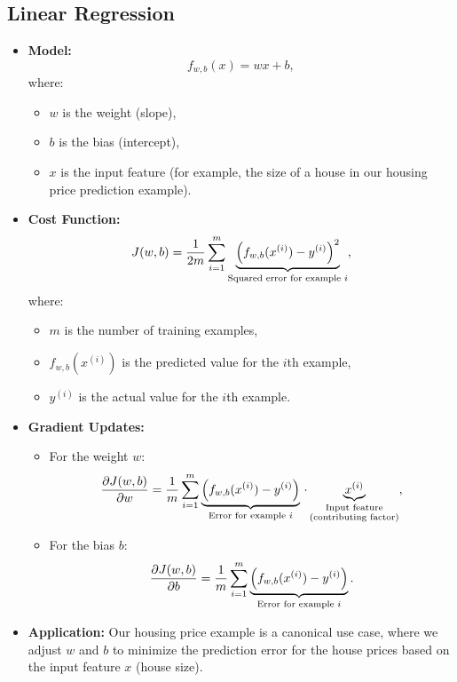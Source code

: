 \documentclass{article}
\begin{document}
\subsection{Linear Regression}
\begin{itemize}
    \item \textbf{Model:} 
    \[
    f_{w,b}(x) = wx + b,
    \]
    where:
    \begin{itemize}[label=\(\bullet\)]
        \item \(w\) is the weight (slope),
        \item \(b\) is the bias (intercept),
        \item \(x\) is the input feature (for example, the size of a house in our housing price prediction example).
    \end{itemize}

    \item \textbf{Cost Function:}
    \[
    J(w,b)=\frac{1}{2m}\sum_{i=1}^{m}\underbrace{\Bigl(f_{w,b}(x^{(i)})-y^{(i)}\Bigr)^2}_{\text{Squared error for example }i},
    \]
    where:
    \begin{itemize}[label=\(\bullet\)]
        \item \(m\) is the number of training examples,
        \item \(f_{w,b}(x^{(i)})\) is the predicted value for the \(i\)th example,
        \item \(y^{(i)}\) is the actual value for the \(i\)th example.
    \end{itemize}

    \item \textbf{Gradient Updates:}
    \begin{itemize}[leftmargin=*, label=\(\bullet\)]
        \item For the weight \(w\):
        \[
        \frac{\partial J(w,b)}{\partial w}=\frac{1}{m}\sum_{i=1}^{m} \underbrace{\Bigl(f_{w,b}(x^{(i)})-y^{(i)}\Bigr)}_{\text{Error for example }i} \, \cdot \underbrace{x^{(i)}}_{\substack{\text{Input feature} \\ \text{(contributing factor)}}},
        \]
        \item For the bias \(b\):
        \[
        \frac{\partial J(w,b)}{\partial b}=\frac{1}{m}\sum_{i=1}^{m} \underbrace{\Bigl(f_{w,b}(x^{(i)})-y^{(i)}\Bigr)}_{\text{Error for example }i}.
        \]
    \end{itemize}

    \item \textbf{Application:} Our housing price example is a canonical use case, where we adjust \(w\) and \(b\) to minimize the prediction error for the house prices based on the input feature \(x\) (house size).
\end{itemize}
\end{document}
